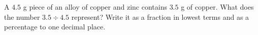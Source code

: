 A $4.5$ g piece of an alloy of copper and zinc contains $3.5$ g of copper. What does the number $3.5\div4.5$ represent? Write it as a fraction in lowest terms and as a percentage to one decimal place.
